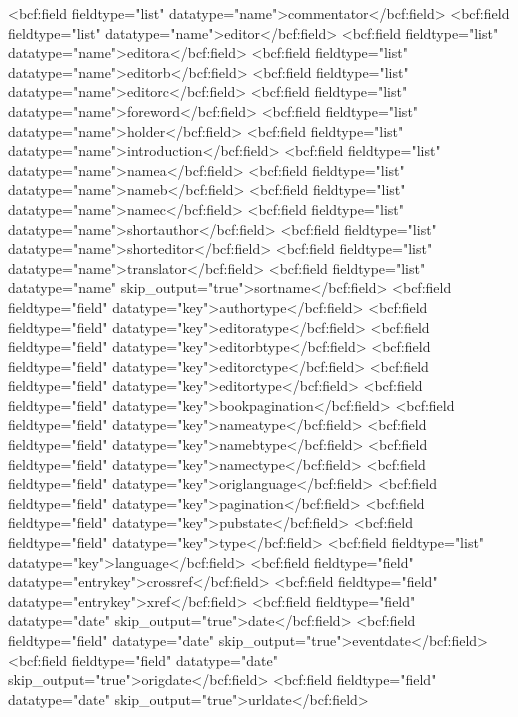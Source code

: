       <bcf:field fieldtype="list" datatype="name">commentator</bcf:field>
      <bcf:field fieldtype="list" datatype="name">editor</bcf:field>
      <bcf:field fieldtype="list" datatype="name">editora</bcf:field>
      <bcf:field fieldtype="list" datatype="name">editorb</bcf:field>
      <bcf:field fieldtype="list" datatype="name">editorc</bcf:field>
      <bcf:field fieldtype="list" datatype="name">foreword</bcf:field>
      <bcf:field fieldtype="list" datatype="name">holder</bcf:field>
      <bcf:field fieldtype="list" datatype="name">introduction</bcf:field>
      <bcf:field fieldtype="list" datatype="name">namea</bcf:field>
      <bcf:field fieldtype="list" datatype="name">nameb</bcf:field>
      <bcf:field fieldtype="list" datatype="name">namec</bcf:field>
      <bcf:field fieldtype="list" datatype="name">shortauthor</bcf:field>
      <bcf:field fieldtype="list" datatype="name">shorteditor</bcf:field>
      <bcf:field fieldtype="list" datatype="name">translator</bcf:field>
      <bcf:field fieldtype="list" datatype="name" skip_output="true">sortname</bcf:field>
      <bcf:field fieldtype="field" datatype="key">authortype</bcf:field>
      <bcf:field fieldtype="field" datatype="key">editoratype</bcf:field>
      <bcf:field fieldtype="field" datatype="key">editorbtype</bcf:field>
      <bcf:field fieldtype="field" datatype="key">editorctype</bcf:field>
      <bcf:field fieldtype="field" datatype="key">editortype</bcf:field>
      <bcf:field fieldtype="field" datatype="key">bookpagination</bcf:field>
      <bcf:field fieldtype="field" datatype="key">nameatype</bcf:field>
      <bcf:field fieldtype="field" datatype="key">namebtype</bcf:field>
      <bcf:field fieldtype="field" datatype="key">namectype</bcf:field>
      <bcf:field fieldtype="field" datatype="key">origlanguage</bcf:field>
      <bcf:field fieldtype="field" datatype="key">pagination</bcf:field>
      <bcf:field fieldtype="field" datatype="key">pubstate</bcf:field>
      <bcf:field fieldtype="field" datatype="key">type</bcf:field>
      <bcf:field fieldtype="list" datatype="key">language</bcf:field>
      <bcf:field fieldtype="field" datatype="entrykey">crossref</bcf:field>
      <bcf:field fieldtype="field" datatype="entrykey">xref</bcf:field>
      <bcf:field fieldtype="field" datatype="date" skip_output="true">date</bcf:field>
      <bcf:field fieldtype="field" datatype="date" skip_output="true">eventdate</bcf:field>
      <bcf:field fieldtype="field" datatype="date" skip_output="true">origdate</bcf:field>
      <bcf:field fieldtype="field" datatype="date" skip_output="true">urldate</bcf:field>
